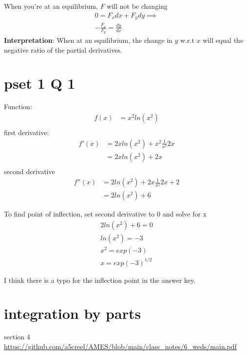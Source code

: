 \documentclass{article}
\begin{document}
When you're at an equilibrium, $F$ will not be changing 
\begin{align}
    0 = F_x dx + F_y dy \implies \\
    - \frac{F_x}{F_y} = \frac{dy}{dx}
\end{align}
\textbf{Interpretation}: When at an equilibrium, the change in $y$ w.r.t $x$ will equal the negative ratio of the partial derivatives.  





\section{pset 1 Q 1}
Function: 
\begin{align}
    f(x) &= x^2 ln(x^2)\\
\end{align}
first derivative: 
\begin{align}
    f'(x) &= 2x ln(x^2) + x^2 \frac{1}{x^2}2x\\
    &= 2x ln(x^2) + 2x \\
\end{align}
second derivative
\begin{align}
    f''(x) &= 2ln(x^2) + 2x \frac{1}{x^2} 2x + 2\\
    &= 2ln(x^2) + 6
\end{align}

To find point of inflection, set second derivative to 0 and solve for x
\begin{align}
    2ln(x^2) + 6 = 0\\
    ln(x^2) = -3 \\
    x^2 = exp(-3) \\
    x = exp(-3)^{1/2}
\end{align}

I think there is a typo for the inflection point in the answer key. 

\section{integration by parts }
section 4 \url{https://github.com/a5creel/AMES/blob/main/class_notes/6_weds/main.pdf}
\end{document}
